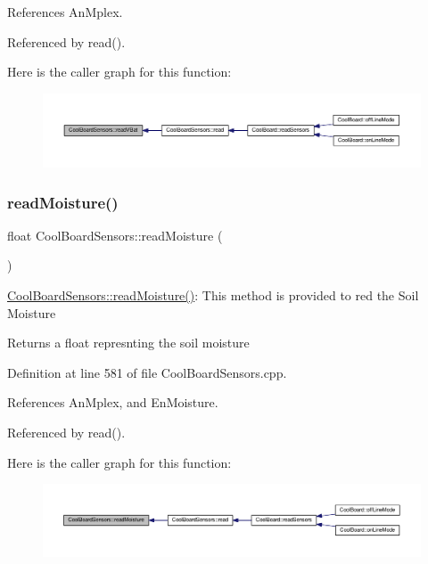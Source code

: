 References An\+Mplex.



Referenced by read().

Here is the caller graph for this function\+:
\nopagebreak
\begin{figure}[H]
\begin{center}
\leavevmode
\includegraphics[width=350pt]{de/d46/class_cool_board_sensors_a6944b6ea7bce8e2fce1b434acfd9d5f3_icgraph}
\end{center}
\end{figure}
\mbox{\label{class_cool_board_sensors_a8761bff50373c485f4465c8db47d0633}} 
\subsubsection{\texorpdfstring{read\+Moisture()}{readMoisture()}}
{\footnotesize\ttfamily float Cool\+Board\+Sensors\+::read\+Moisture (\begin{DoxyParamCaption}{ }\end{DoxyParamCaption})}

\hyperlink{class_cool_board_sensors_a8761bff50373c485f4465c8db47d0633}{Cool\+Board\+Sensors\+::read\+Moisture()}\+: This method is provided to red the Soil Moisture

\begin{DoxyReturn}{Returns}
a float represnting the soil moisture 
\end{DoxyReturn}


Definition at line 581 of file Cool\+Board\+Sensors.\+cpp.



References An\+Mplex, and En\+Moisture.



Referenced by read().

Here is the caller graph for this function\+:
\nopagebreak
\begin{figure}[H]
\begin{center}
\leavevmode
\includegraphics[width=350pt]{de/d46/class_cool_board_sensors_a8761bff50373c485f4465c8db47d0633_icgraph}
\end{center}
\end{figure}


